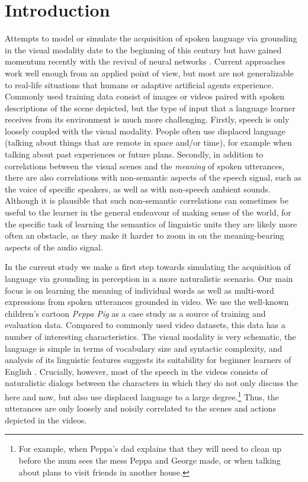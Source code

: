 \section{Introduction}
\label{sec:intro}

Attempts to model or simulate the acquisition of spoken language via
grounding in the visual modality date to the beginning of this century
\citep{roypentland2002learning} but have gained momentum recently
with the revival of neural networks
\citep[e.g.][]{synnaeve2014learning,harwath2015deep,
  harwath2016unsupervised,chrupala-etal-2017-representations,alishahi-etal-2017-encoding,harwath2018jointly,Merkx2019,havard2019models,rouditchenko2020avlnet,khorrami_2021,peng2021fastslow}.
Current approaches work well enough from an applied point of view, 
but most are not generalizable to real-life situations that humans or 
adaptive artificial agents experience. Commonly used training data
consist of images or videos paired with spoken descriptions
of the scene depicted, but the type of input that a language learner receives 
from its environment is much more challenging.  Firstly, speech is only
loosely coupled with the visual modality. People often use displaced language 
(talking about things that are remote in space and/or time), for example when 
talking about past experiences or future plans.
Secondly, in addition to
correlations between the visual scenes and the {\it meaning} of spoken
utterances, there are also correlations with non-semantic aspects of
the speech signal, such as the voice of specific speakers, as well
as with non-speech ambient sounds. Although it is plausible that such
non-semantic correlations can sometimes be useful to the learner in
the general endeavour of making sense of the world, for the specific
task of learning the semantics of linguistic units they are likely more
often an obstacle, as they make it harder to zoom in on the
meaning-bearing aspects of the audio signal.

In the current study we make a first step towards simulating the
acquisition of language via grounding in perception in a more naturalistic
scenario.  Our main focus is on learning the meaning of individual words 
as well as multi-word expressions from spoken utterances grounded in video.  
We use the well-known children's cartoon {\it Peppa Pig} as
a case study as a source of training and evaluation data. Compared to
commonly used video datasets, this data has a number of interesting
characteristics.  The visual modality is very schematic,  the
language is simple in terms of vocabulary size and syntactic
complexity, and analysis of its linguistic features suggests its suitability for beginner learners of English \cite{kokla2021peppa,scheffler2021peppa}.
Crucially, however, most of the speech in the videos
consists of naturalistic dialogs between the characters in which they do not 
only discuss the here and now, but also use displaced language to a large 
degree.\footnote{For example, when Peppa's dad explains that they will need to 
clean up before the mum sees the mess Peppa and George made, or when talking 
about plans to visit friends in another house.} 
Thus, the utterances are only loosely and noisily correlated to the scenes and
actions depicted in the videos. 

